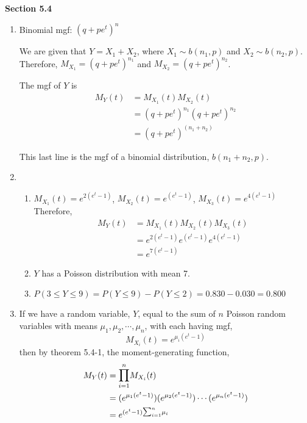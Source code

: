 \documentclass{article}
\newcommand\lsum{\mathlarger{\sum}}
\newcommand\lprod{\mathlarger{\prod}}
\newcommand\myskip[1]{\addtocounter{enumi}{#1}}
\begin{document}
    \textbf{Section 5.4}
    \begin{enumerate}
     \myskip{1}
     \item 
      Binomial mgf: $(q + pe^t)^n$
      
      We are given that $Y = X_1 + X_2$, where $X_1 \sim b(n_1, p)$ and $X_2 \sim b(n_2, p)$.\\
      Therefore, $M_{X_1} = (q + pe^t)^{n_1}$ and $M_{X_2} = (q + pe^t)^{n_2}$. 
      
      The mgf of $Y$ is 
      \begin{align*}
       M_Y(t) &= M_{X_1}(t)M_{X_2}(t) \\
	&= (q + pe^t)^{n_1}(q + pe^t)^{n_2} \\
	&= (q + pe^t)^{(n_1 + n_2)}
      \end{align*}
      
      This last line is the mgf of a binomial distribution, $b(n_1+n_2, p)$.
     
     \item
      \begin{enumerate}
       \item 
	$M_{X_1}(t) = e^{2(e^t - 1)}$,  $M_{X_2}(t) = e^{(e^t - 1)}$,  $M_{X_3}(t) = e^{4(e^t - 1)}$ \\
	Therefore, 
	\begin{align*}
	M_Y(t) &= M_{X_1}(t)M_{X_2}(t)M_{X_3}(t) \\
	  &= e^{2(e^t - 1)} e^{(e^t - 1)} e^{4(e^t - 1)} \\
	  &= e^{7(e^t - 1)}
	\end{align*}
	
       \item
	$Y$ has a Poisson distribution with mean 7.
       
       \item
	$P(3 \le Y \le 9) = P(Y \le 9) - P(Y \le 2) = 0.830 - 0.030 = 0.800$
      \end{enumerate}
     
     \item
      If we have a random variable, $Y$, equal to the sum of $n$ Poisson random variables with 
      means $\mu_1, \mu_2, \cdots, \mu_n$, with each having mgf, 
      $$M_{X_i}(t) = e^{\mu_i(e^t - 1)}$$
      then by theorem 5.4-1, the moment-generating function,
      \begin{align*}
       M_Y(t) &= \lprod_{i=1}^n M_{X_i}(t) \\
	&= (e^{\mu_1(e^t - 1)})(e^{\mu_2(e^t - 1)})\cdots(e^{\mu_n(e^t - 1)}) \\
	&= e^{(e^t - 1)\lsum_{i=1}^n {\mu_i}}
      \end{align*}
      

\end{enumerate}
\end{document}
